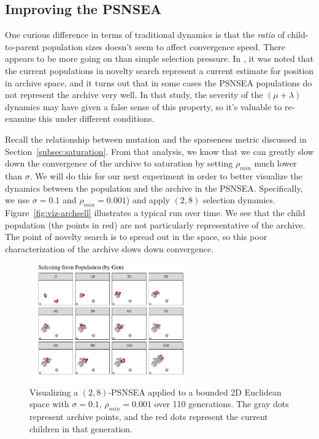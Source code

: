 \documentclass[twoside]{article}
\begin{document}
\subsection{Improving the PSNSEA}
\label{subsec:psnsea:improve}

One curious difference in terms of traditional dynamics is that the \emph{ratio} of child-to-parent population sizes doesn't seem to affect convergence speed.  There appears to be more going on than simple selection pressure.  In \citet{Wiegand2021flairs}, it was noted that the current populations in novelty search represent a current estimate for position in archive space, and it turns out that in some cases the PSNSEA populations do not represent the archive very well.  In that study, the severity of the $(\mu+\lambda)$ dynamics may have given a false sense of this property, so it's valuable to re-examine this under different conditions.

Recall the relationship between mutation and the sparseness metric discussed in Section~\ref{subsec:saturation}.  From that analysis, we know that we can greatly slow down the convergence of the archive to saturation by setting $\rho_{min}$ much lower than $\sigma$.  We will do this for our next experiment in order to better visualize the dynamics between the population and the archive in the PSNSEA.  Specifically, we use $\sigma=0.1$ and $\rho_{min}=0.001$) and apply $(2,8)$ selection dynamics.  Figure~\ref{fig:viz-archsell} illustrates a typical run over time.  We see that the child population (the points in red) are not particularly representative of the archive.  The point of novelty search is to spread out in the space, so this poor characterization of the archive slows down convergence.
%
\begin{figure}[h]
  \center\includegraphics[width=0.6\textwidth]{Figures/viz-archive-and-pop-s01-r0001-mu16lam32-popsel.pdf}
  \caption{\label{fig:viz-popsel} Visualizing a $(2,8)$-PSNSEA applied to a bounded 2D Euclidean space with $\sigma=0.1$, $\rho_{min}=0.001$ over 110 generations.  The gray dots represent archive points, and the red dots represent the current children in that generation.}
\end{figure}
\end{document}
